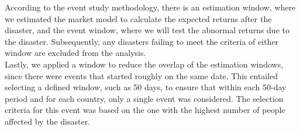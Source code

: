 \documentclass{article}
\begin{document}
According to the event study methodology, there is an estimation window, where we estimated the market model to calculate the expected returns after the disaster, and the event window, where we will test the abnormal returns due to the disaster. Subsequently, any disasters failing to meet the criteria of either window are excluded from the analysis. \\
Lastly, we applied a window to reduce the overlap of the estimation windows, since there were events that started roughly on the same date. This entailed selecting a defined window, such as 50 days, to ensure that within each 50-day period and for each country, only a single event was considered. The selection criteria for this event was based on the one with the highest number of people affected by the disaster.
\end{document}
